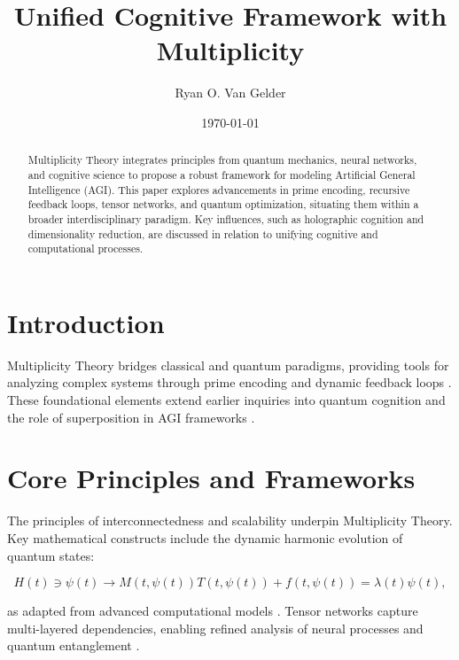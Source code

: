 \documentclass{article}
\theoremstyle{plain}
\begin{document}
\title{Unified Cognitive Framework with Multiplicity}

\author{Ryan O. Van Gelder}
\date{\today}

\maketitle

\begin{abstract}
Multiplicity Theory integrates principles from quantum mechanics, neural networks, and cognitive science to propose a robust framework for modeling Artificial General Intelligence (AGI). This paper explores advancements in prime encoding, recursive feedback loops, tensor networks, and quantum optimization, situating them within a broader interdisciplinary paradigm. Key influences, such as holographic cognition and dimensionality reduction, are discussed in relation to unifying cognitive and computational processes.
\end{abstract}

\section{Introduction}

Multiplicity Theory bridges classical and quantum paradigms, providing tools for analyzing complex systems through prime encoding and dynamic feedback loops \cite{Pribram1991, Penrose1994}. These foundational elements extend earlier inquiries into quantum cognition and the role of superposition in AGI frameworks \cite{Biamonte2017, Tegmark2017}.

\section{Core Principles and Frameworks}

The principles of interconnectedness and scalability underpin Multiplicity Theory. Key mathematical constructs include the dynamic harmonic evolution of quantum states:

\begin{equation}
H(t) \ni \psi(t) \rightarrow M(t, \psi(t)) T(t, \psi(t)) + f(t, \psi(t)) = \lambda(t) \psi(t),
\end{equation}

as adapted from advanced computational models \cite{Goodfellow2014, Lloyd2000}. Tensor networks capture multi-layered dependencies, enabling refined analysis of neural processes and quantum entanglement \cite{Hinton2006, LeCun2015}.
\end{document}
